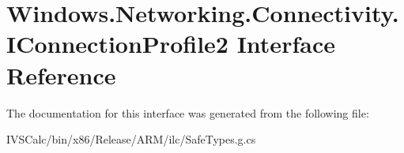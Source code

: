 \hypertarget{interface_windows_1_1_networking_1_1_connectivity_1_1_i_connection_profile2}{}\section{Windows.\+Networking.\+Connectivity.\+I\+Connection\+Profile2 Interface Reference}
\label{interface_windows_1_1_networking_1_1_connectivity_1_1_i_connection_profile2}


The documentation for this interface was generated from the following file\+:\begin{DoxyCompactItemize}
\item 
I\+V\+S\+Calc/bin/x86/\+Release/\+A\+R\+M/ilc/Safe\+Types.\+g.\+cs\end{DoxyCompactItemize}
